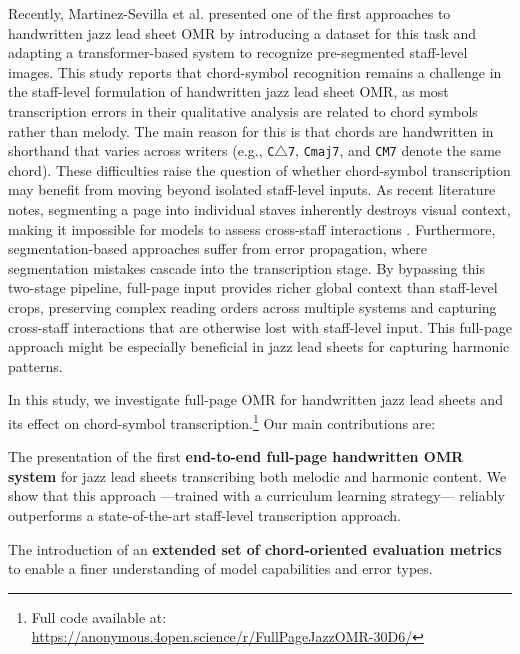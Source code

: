 \documentclass{article}
\begin{document}
Recently, Martinez-Sevilla et al. presented one of the first approaches to handwritten jazz lead sheet OMR by introducing a dataset for this task and adapting a transformer-based system to recognize pre-segmented staff-level images\cite{martinez-sevilla_optical_2025}. This study reports that chord-symbol recognition remains a challenge in the staff-level formulation of handwritten jazz lead sheet OMR, as most transcription errors in their qualitative analysis are related to chord symbols rather than melody. The main reason for this is that chords are handwritten in shorthand that varies across writers (e.g., \texttt{C$\triangle$7}, \texttt{Cmaj7}, and \texttt{CM7} denote the same chord). These difficulties raise the question of whether chord-symbol transcription may benefit from moving beyond isolated staff-level inputs. As recent literature notes, segmenting a page into individual staves inherently destroys visual context, making it impossible for models to assess cross-staff interactions \cite{RiosVila2026FullPageOMR}. Furthermore, segmentation-based approaches suffer from error propagation, where segmentation mistakes cascade into the transcription stage. By bypassing this two-stage pipeline, full-page input provides richer global context than staff-level crops, preserving complex reading orders across multiple systems and capturing cross-staff interactions that are otherwise lost with staff-level input. This full-page approach might be especially beneficial in jazz lead sheets for capturing harmonic patterns. %

In this study, we investigate full-page OMR for handwritten jazz lead sheets and its effect on chord-symbol transcription.\footnote{Full code available at: \url{https://anonymous.4open.science/r/FullPageJazzOMR-30D6/}} Our main contributions are:
\begin{compactitem}
\item The presentation of the first \textbf{end-to-end full-page handwritten OMR system} for jazz lead sheets transcribing both melodic and harmonic content. We show that this approach ---trained with a curriculum learning strategy--- reliably outperforms a state-of-the-art staff-level transcription approach.
\item The introduction of an \textbf{extended set of chord-oriented evaluation metrics} to enable a finer understanding of model capabilities and error types.
\end{compactitem}
\end{document}
